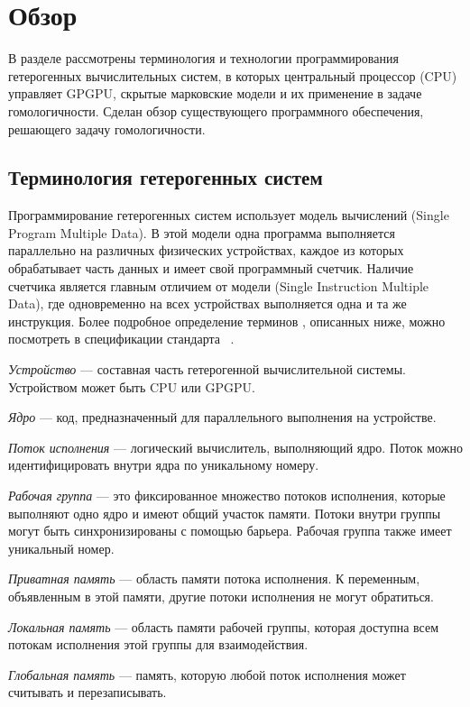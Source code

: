 \section{Обзор}
В разделе рассмотрены терминология и технологии программирования гетерогенных
вычислительных систем, в которых центральный процессор (CPU) управляет GPGPU, 
скрытые марковские модели и их применение в задаче гомологичности.
Сделан обзор существующего программного обеспечения, решающего задачу
гомологичности.

\subsection{Терминология гетерогенных систем}
Программирование гетерогенных систем использует модель вычислений  
(Single Program Multiple Data).
В этой модели одна программа выполняется параллельно на
различных физических устройствах, каждое из которых обрабатывает часть данных и
имеет свой программный счетчик.
Наличие счетчика является главным отличием от модели  (Single
Instruction Multiple Data), где одновременно на всех устройствах выполняется
одна и та же инструкция.
Более подробное определение терминов , описанных ниже, можно 
посмотреть в спецификации стандарта ~\cite{OpenCL_spec}.

\emph{Устройство} --- составная часть гетерогенной вычислительной системы.
Устройством может быть CPU или GPGPU.

\emph{Ядро} --- код, предназначенный для параллельного выполнения на
устройстве.
	
\emph{Поток исполнения} --- логический вычислитель, выполняющий ядро.
Поток можно идентифицировать внутри ядра по уникальному номеру.

\emph{Рабочая группа} --- это фиксированное множество потоков исполнения,
которые выполняют одно ядро и имеют общий участок памяти.
Потоки внутри группы могут быть синхронизированы с помощью барьера.
Рабочая группа также имеет уникальный номер.

\emph{Приватная память} --- область памяти потока исполнения. 
К переменным, объявленным в этой памяти, другие потоки исполнения не могут 
обратиться.

\emph{Локальная память} --- область памяти рабочей группы, которая доступна
всем потокам исполнения этой группы для взаимодействия.

\emph{Глобальная память} --- память, которую любой поток исполнения может считывать и перезаписывать.

